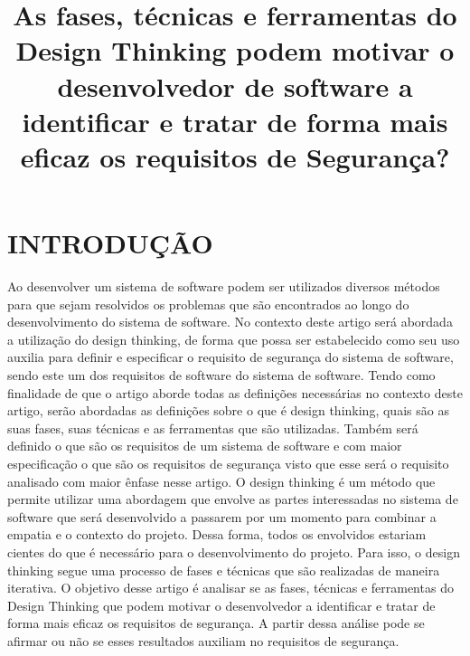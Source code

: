 \documentclass[a4paper,twoside]{article}
\begin{document}
\title{As fases, técnicas e ferramentas do Design Thinking podem motivar o desenvolvedor de software a identificar e tratar de forma mais eficaz os requisitos de Segurança?}

\author{
}



\onecolumn \maketitle \normalsize \setcounter{footnote}{0} \vfill

\section{\uppercase{Introdução}}Ao desenvolver um sistema de software podem ser utilizados diversos métodos para que sejam resolvidos os problemas que são encontrados ao longo do desenvolvimento do sistema de software. No contexto deste artigo será abordada a utilização do design thinking, de forma que possa ser estabelecido  como seu uso auxilia para definir e especificar o requisito de segurança do sistema de software, sendo este um dos requisitos de software do sistema de software. Tendo como finalidade de que o artigo aborde todas as definições necessárias no contexto deste artigo, serão abordadas as definições sobre o que é design thinking, quais são as suas fases, suas técnicas e as ferramentas que são utilizadas. Também será definido o que são os requisitos de um sistema de software e com maior especificação o que são os requisitos de segurança visto que esse será o requisito analisado com maior ênfase nesse artigo. 
O design thinking é um método que permite utilizar uma abordagem que envolve as partes interessadas no sistema de software que será desenvolvido a passarem por um momento para combinar a empatia e o contexto do projeto. Dessa forma, todos os envolvidos estariam cientes do que é necessário para o desenvolvimento do projeto. Para isso, o design thinking segue uma processo de fases e técnicas que são realizadas de maneira iterativa.
O objetivo desse artigo é analisar se as fases, técnicas e ferramentas do Design Thinking que podem motivar o desenvolvedor a identificar e tratar de forma mais eficaz os requisitos de segurança. A partir dessa análise pode se afirmar ou não se esses resultados auxiliam no requisitos de segurança\cite{Definicao}\cite{Sommerville_2011_texbook}.
\label{sec:introduction}
\end{document}
